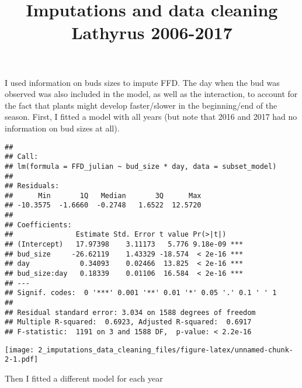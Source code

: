 \documentclass[]{article}
\title{Imputations and data cleaning Lathyrus 2006-2017}
\author{}
\date{}
\begin{document}
\maketitle

I used information on buds sizes to impute FFD. The day when the bud was
observed was also included in the model, as well as the interaction, to
account for the fact that plants might develop faster/slower in the
beginning/end of the season. First, I fitted a model with all years (but
note that 2016 and 2017 had no information on bud sizes at all).

\begin{verbatim}
## 
## Call:
## lm(formula = FFD_julian ~ bud_size * day, data = subset_model)
## 
## Residuals:
##      Min       1Q   Median       3Q      Max 
## -10.3575  -1.6660  -0.2748   1.6522  12.5720 
## 
## Coefficients:
##               Estimate Std. Error t value Pr(>|t|)    
## (Intercept)   17.97398    3.11173   5.776 9.18e-09 ***
## bud_size     -26.62119    1.43329 -18.574  < 2e-16 ***
## day            0.34093    0.02466  13.825  < 2e-16 ***
## bud_size:day   0.18339    0.01106  16.584  < 2e-16 ***
## ---
## Signif. codes:  0 '***' 0.001 '**' 0.01 '*' 0.05 '.' 0.1 ' ' 1
## 
## Residual standard error: 3.034 on 1588 degrees of freedom
## Multiple R-squared:  0.6923, Adjusted R-squared:  0.6917 
## F-statistic:  1191 on 3 and 1588 DF,  p-value: < 2.2e-16
\end{verbatim}

\texttt{[image: 2\_imputations\_data\_cleaning\_files/figure-latex/unnamed-chunk-2-1.pdf]}

Then I fitted a different model for each year
\end{document}
